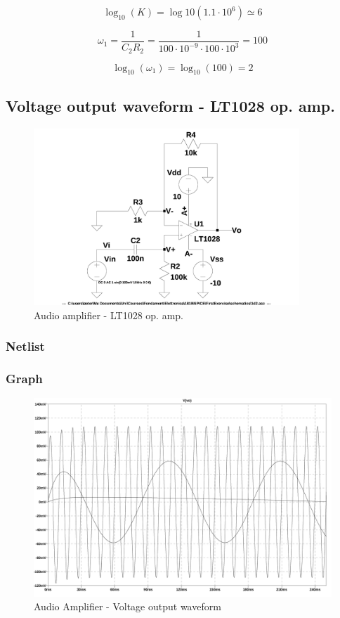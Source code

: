 \documentclass[10pt,a4paper]{article}
\begin{document}
$$ \log_{10}(K) = \log{10}(1.1 \cdot 10^6) \simeq 6$$

$$ \omega_1 = \frac{1}{C_2R_2} =
\frac{1}{100 \cdot 10^{-9} \cdot 100 \cdot 10^3} = 100$$

$$\log_{10} (\omega_1) = \log_{10} (100) = 2$$

\subsection{Voltage output waveform - LT1028 op. amp.}
\begin{figure}[h]
  \centering
  \includegraphics[width=10cm]{schematics/1d2.jpg}
  \caption{Audio amplifier - LT1028 op. amp.}
  \label{1d2}
\end{figure}

\subsubsection{Netlist}


\subsubsection{Graph}
\begin{figure}[H]
  \centering
  \includegraphics[width=14cm]{graph/1d2.jpg}
  \caption{Audio Amplifier - Voltage output waveform}
  \label{1d2}
\end{figure}
\end{document}
